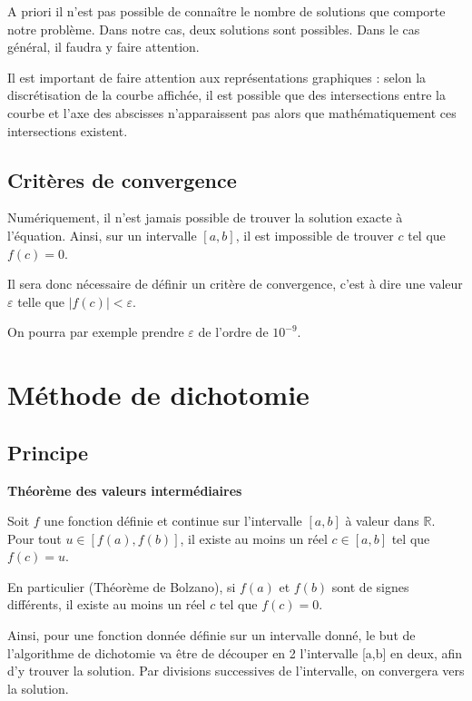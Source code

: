 \documentclass[10pt]{article}
\begin{document}
\begin{rem}
A priori il n'est pas possible de connaître le nombre de solutions que comporte notre problème. Dans notre cas, deux solutions sont possibles. Dans le cas général, il faudra y faire attention.
\end{rem}

\begin{warn}
Il est important de faire attention aux représentations graphiques : selon la discrétisation de la courbe affichée, il est possible que des intersections entre la courbe et l'axe des abscisses n'apparaissent pas alors que mathématiquement ces intersections existent. 
\end{warn}

\subsection{Critères de convergence}

Numériquement, il n'est jamais possible de trouver la solution exacte à l'équation. Ainsi, sur un intervalle $[a,b]$, il est impossible de trouver $c$ tel que $f(c)=0$.

Il sera donc nécessaire de définir un critère de convergence, c'est à dire une valeur $\varepsilon$ telle que $|f(c)|<\varepsilon$.

On pourra par exemple prendre $\varepsilon$ de l'ordre de $10^{-9}$.

\section{Méthode de dichotomie}

\subsection{Principe}
\begin{theo}
\textbf{Théorème des valeurs intermédiaires}

Soit $f$ une fonction définie et continue sur l'intervalle $[a,b]$ à valeur dans $\mathbb{R}$. Pour tout $u\in[f(a),f(b)]$, il existe au moins un réel $c\in [a,b]$  tel que $f(c)=u$.

 En particulier (Théorème de Bolzano), si $f(a)$ et $f(b)$ sont de signes différents, il existe au moins un réel $c$ tel que $f(c)=0$. 
\end{theo}

Ainsi, pour une fonction donnée définie sur un intervalle donné, le but de l'algorithme de dichotomie va être de découper en 2 l'intervalle [a,b] en deux, afin d'y trouver la solution. Par divisions successives de l'intervalle, on convergera vers la solution.
\end{document}
